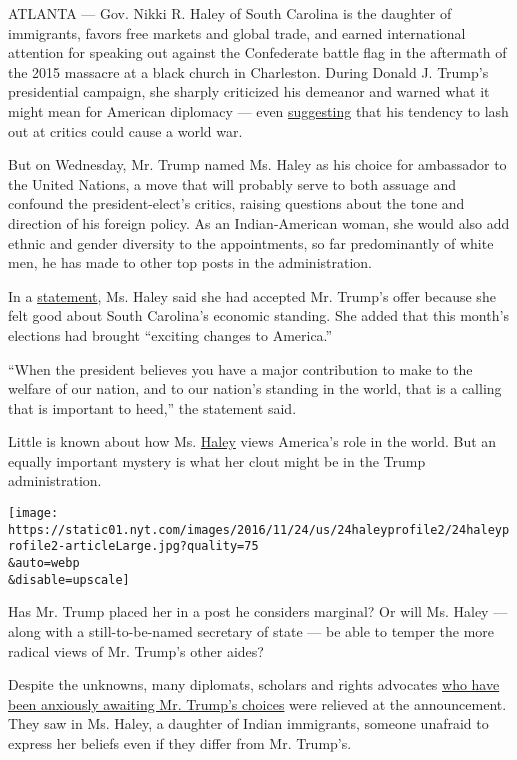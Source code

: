 ATLANTA --- Gov. Nikki R. Haley of South Carolina is the daughter of
immigrants, favors free markets and global trade, and earned
international attention for speaking out against the Confederate battle
flag in the aftermath of the 2015 massacre at a black church in
Charleston. During Donald J. Trump's presidential campaign, she sharply
criticized his demeanor and warned what it might mean for American
diplomacy --- even
\href{https://www.washingtonpost.com/opinions/nikki-haley-takes-on-donald-trump/2015/09/02/0ba0dbb0-51b2-11e5-8c19-0b6825aa4a3a_story.html?utm_term=.9c47bf4b5403}{suggesting}
that his tendency to lash out at critics could cause a world war.

But on Wednesday, Mr. Trump named Ms. Haley as his choice for ambassador
to the United Nations, a move that will probably serve to both assuage
and confound the president-elect's critics, raising questions about the
tone and direction of his foreign policy. As an Indian-American woman,
she would also add ethnic and gender diversity to the appointments, so
far predominantly of white men, he has made to other top posts in the
administration.

In a
\href{http://www.jaspersuntimes.com/news/2016-11-23/gov-haleys-statement-being-named-ambassador-united-nations}{statement},
Ms. Haley said she had accepted Mr. Trump's offer because she felt good
about South Carolina's economic standing. She added that this month's
elections had brought ``exciting changes to America.''

``When the president believes you have a major contribution to make to
the welfare of our nation, and to our nation's standing in the world,
that is a calling that is important to heed,'' the statement said.

Little is known about how Ms.
\href{http://www.nytimes.com/2016/11/23/us/politics/nikki-haley-donald-trump-un-ambassador.html}{Haley}
views America's role in the world. But an equally important mystery is
what her clout might be in the Trump administration.

\texttt{[image: https://static01.nyt.com/images/2016/11/24/us/24haleyprofile2/24haleyprofile2-articleLarge.jpg?quality=75\\\&auto=webp\\\&disable=upscale]}

Has Mr. Trump placed her in a post he considers marginal? Or will Ms.
Haley --- along with a still-to-be-named secretary of state --- be able
to temper the more radical views of Mr. Trump's other aides?

Despite the unknowns, many diplomats, scholars and rights advocates
\href{http://www.nytimes.com/2016/11/20/world/americas/united-nations-trump-climate-change-iran-cuba.html}{who
have been anxiously awaiting Mr. Trump's choices} were relieved at the
announcement. They saw in Ms. Haley, a daughter of Indian immigrants,
someone unafraid to express her beliefs even if they differ from Mr.
Trump's.

